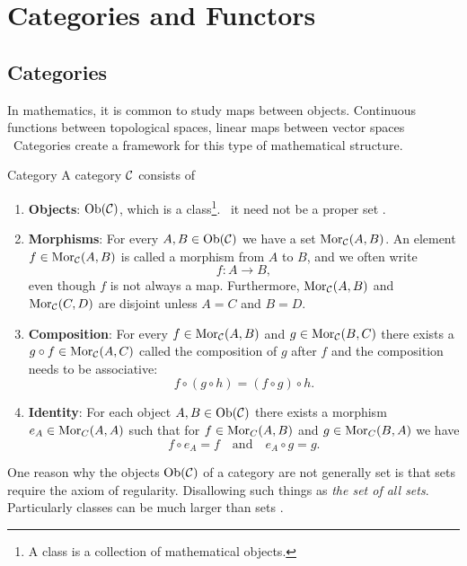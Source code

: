 \chapter{Categories and Functors}
\label{chapter__category_theory}
\section{Categories}

In mathematics, it is common to study maps between objects.
Continuous functions between topological spaces, linear maps between vector spaces \etc\
Categories create a framework for this type of mathematical structure.

\begin{definition}{Category \cite[Section~1.2]{Roman2017}}{}
A category $\mathcal{C}$ consists of
\begin{enumerate}
    \item \textbf{Objects}: $\mathrm {Ob}(\mathcal{C})$, which is a class\footnote{A class is a collection of mathematical objects.}. \Ie\ it need not be a proper set \cite[p.~1]{Roman2017}.
    
    \item \textbf{Morphisms}: For every $A, B \in \mathrm {Ob}(\mathcal{C})$ we have a set $\mathrm {Mor}_{\mathcal{C}}(A,B)$. An element $f \in \mathrm {Mor}_{\mathcal{C}}(A,B)$ is called a morphism from $A$ to $B$, and we often write 
    $$
    f: A \to B,
    $$
    even though $f$ is not always a map. Furthermore, $\mathrm {Mor}_{\mathcal{C}}(A,B)$ and $\mathrm {Mor}_{\mathcal{C}}(C,D)$ are disjoint unless $A = C$ and $B = D$.
    
    \item \textbf{Composition}: For every $f \in \mathrm {Mor}_{\mathcal{C}}(A,B)$ and $g \in \mathrm {Mor}_{\mathcal{C}}(B,C)$ there exists a $g \circ f \in \mathrm {Mor}_{\mathcal{C}}(A,C)$ called the composition of $g$ after $f$ and the composition needs to be associative: 
    $$
    f \circ (g \circ h) = (f \circ g) \circ h.
    $$

    \item \textbf{Identity}: For each object $A,B \in \mathrm {Ob}(\mathcal{C})$ there exists a morphism $e_A \in \mathrm {Mor}_C(A,A)$ such that for $f \in \mathrm {Mor}_C(A,B)$ and $g \in \mathrm {Mor}_C(B,A)$ we have
    $$
    f \circ e_A = f \quad \text{and} \quad e_A \circ g = g.
    $$
\end{enumerate}
\end{definition}

One reason why the objects $\mathrm {Ob}(\mathcal{C})$ of a category are not generally set is that sets require the axiom of regularity. 
Disallowing such things as \emph{the set of all sets}. Particularly classes can be much larger than sets \cite[p.~1]{Roman2017}.

